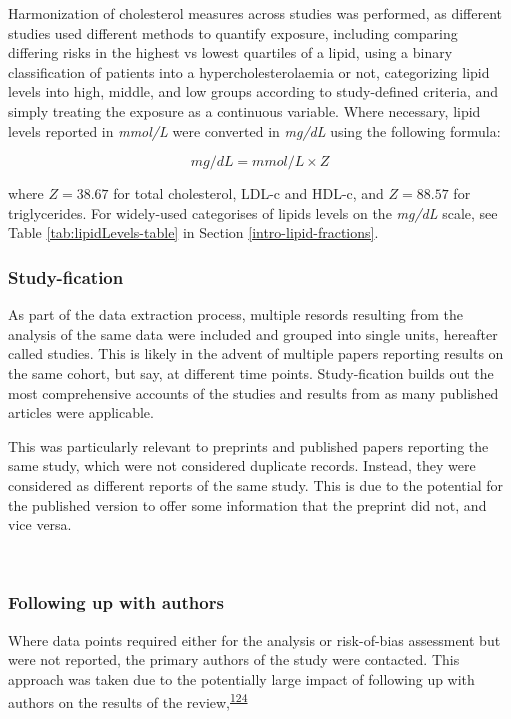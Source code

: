 \documentclass[a4paper, twoside]{templates/ociamthesis}
\begin{document}
Harmonization of cholesterol measures across studies was performed, as different studies used different methods to quantify exposure, including comparing differing risks in the highest vs lowest quartiles of a lipid, using a binary classification of patients into a hypercholesterolaemia or not, categorizing lipid levels into high, middle, and low groups according to study-defined criteria, and simply treating the exposure as a continuous variable. Where necessary, lipid levels reported in \emph{mmol/L} were converted in \emph{mg/dL} using the following formula:

\begin{equation} 
  mg/dL = mmol/L \times{} Z
  \label{eq:lipidConversion}
\end{equation}

where \(Z = 38.67\) for total cholesterol, LDL-c and HDL-c, and \(Z = 88.57\) for triglycerides. For widely-used categorises of lipids levels on the \emph{mg/dL} scale, see Table \ref{tab:lipidLevels-table} in Section \ref{intro-lipid-fractions}.

\hypertarget{study-fication}{%
\subsubsection{Study-fication}\label{study-fication}}

As part of the data extraction process, multiple resords resulting from the analysis of the same data were included and grouped into single units, hereafter called studies. This is likely in the advent of multiple papers reporting results on the same cohort, but say, at different time points. Study-fication builds out the most comprehensive accounts of the studies and results from as many published articles were applicable.

This was particularly relevant to preprints and published papers reporting the same study, which were not considered duplicate records. Instead, they were considered as different reports of the same study. This is due to the potential for the published version to offer some information that the preprint did not, and vice versa.

~

\hypertarget{contacting-authors}{%
\subsubsection{Following up with authors}\label{contacting-authors}}

Where data points required either for the analysis or risk-of-bias assessment but were not reported, the primary authors of the study were contacted. This approach was taken due to the potentially large impact of following up with authors on the results of the review,\textsuperscript{\protect\hyperlink{ref-reynders2019}{124}}
\end{document}
